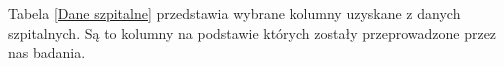 \documentclass[a4paper,11pt,twoside]{report}
\theoremstyle{definition}
\begin{document}
\begin{description}
\newline  \newline   \newline   \newline   \newline   \newline   \newline   \newline   \newline   \newline   \newline   \newline   \newline   \newline   \newline  \newline  
\end{description}
Tabela \ref{Dane szpitalne} przedstawia wybrane kolumny uzyskane z danych szpitalnych. Są to kolumny na podstawie których zostały przeprowadzone przez nas badania.
\\
\end{document}
